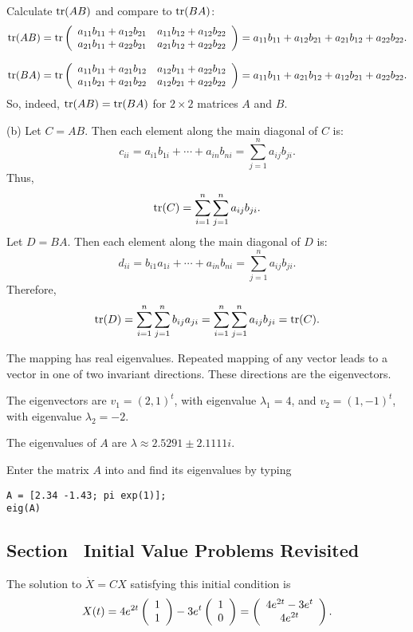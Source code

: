 \documentclass{ximera}
\begin{document}
Calculate ${\rm tr}(AB)$ and compare to ${\rm tr}(BA)$:
\[
{\rm tr}(AB) =
{\rm tr}\left(\begin{array}{rr} a_{11}b_{11} + a_{12}b_{21} & a_{11}b_{12} + a_{12}b_{22}\\ a_{21}b_{11} + a_{22}b_{21} &a_{21}b_{12} + a_{22}b_{22}\end{array}\right) =
a_{11}b_{11} + a_{12}b_{21} + a_{21}b_{12} + a_{22}b_{22}.
\]

\[
{\rm tr}(BA) =
{\rm tr}\left(\begin{array}{rr} a_{11}b_{11} + a_{21}b_{12} & a_{12}b_{11} + a_{22}b_{12}\\ a_{11}b_{21} + a_{21}b_{22} &a_{12}b_{21} + a_{22}b_{22}\end{array}\right) =
a_{11}b_{11} + a_{21}b_{12} + a_{12}b_{21} + a_{22}b_{22}.
\]
So, indeed, ${\rm tr}(AB) = {\rm tr}(BA)$ for $2 \times 2$ matrices
$A$ and $B$.

(b) Let $C = AB$.  Then each element along the main diagonal of $C$ is:
\[
c_{ii} = a_{i1}b_{1i} + \cdots + a_{in}b_{ni} =
\sum_{j = 1}^{n} a_{ij}b_{ji}.
\]
Thus,
\[
{\rm tr}(C) = \sum_{i = 1}^{n} \sum_{j = 1}^{n} a_{ij}b_{ji}.
\]
Let $D = BA$.  Then each element along the main diagonal of $D$ is:
\[
d_{ii} = b_{i1}a_{1i} + \cdots + a_{in}b_{ni} =
\sum_{j = 1}^n a_{ij}b_{ji}.
\]
Therefore,
\[
{\rm tr}(D) = \sum_{i = 1}^{n} \sum_{j = 1}^{n} b_{ij}a_{ji}
= \sum_{i = 1}^{n} \sum_{j = 1}^{n} a_{ij}b_{ji} = {\rm tr}(C).
\]

 The mapping has real eigenvalues.  Repeated mapping of any
vector leads to a vector in one of two invariant directions.  These
directions are the eigenvectors.

\newpage
{} The eigenvectors are $v_1 = (2,1)^t$, with eigenvalue
$\lambda_1 = 4$, and $v_2 = (1,-1)^t$, with eigenvalue $\lambda_2 = -2$.

 \ans The eigenvalues of $A$ are $\lambda \approx 2.5291 \pm
2.1111i$.

\soln Enter the matrix $A$ into \Matlab and find its eigenvalues by typing
\begin{verbatim}
A = [2.34 -1.43; pi exp(1)];
eig(A)
\end{verbatim}



\subsection*{Section~\protect{\ref{S:IVPR}} Initial Value Problems Revisited}

 \ans The solution to $\dot{X} = CX$ satisfying this
initial condition is
\[
X(t) = 4e^{2t}\left(\begin{array}{r} 1 \\ 1\end{array}\right) - 3e^t\left(\begin{array}{r} 1 \\ 0\end{array}\right)
= \left(\begin{array}{c} 4e^{2t} - 3e^t \\ 4e^{2t}\end{array}\right).
\]
\end{document}
